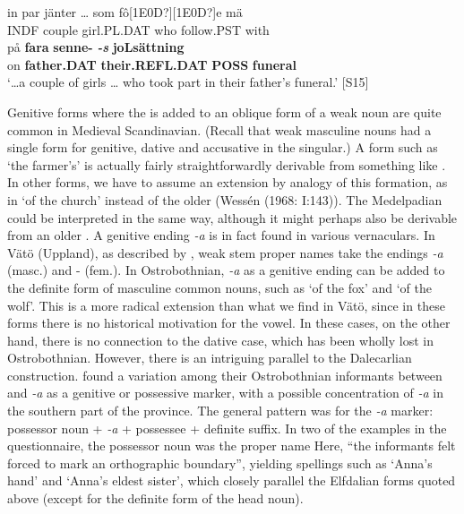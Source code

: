 \ea\label{}
\gll in  par  jänter  …  som  fô[1E0D?][1E0D?]e  mä\\
INDF  couple  girl.PL.DAT    who  follow.PST  with\\
\gll på  \textbf{fara} \textbf{senne-}\textbf{\textit{  }}\textbf{\textit{\nobreakdash-s}} \textbf{joLsättning} \\
on  \textbf{father.DAT} \textbf{their.REFL.DAT} \textbf{POSS} \textbf{funeral} \\
\glt ‘…a couple of girls … who took part in their father’s funeral.’ [S15]
\z

Genitive forms where the is added to an oblique form of a weak noun are quite common in Medieval Scandinavian. (Recall that weak masculine nouns had a single form for genitive, dative and accusative in the singular.) A form such as  ‘the farmer’s’ is actually fairly straightforwardly derivable from something like . In other forms, we have to assume an extension by analogy of this formation, as in  ‘of the church’ instead of the older  (Wessén (1968: I:143)). The Medelpadian  could be interpreted in the same way, although it might perhaps also be derivable from an older . A genitive ending\textit{ {}-a} is in fact found in various vernaculars. In Vätö (Uppland), as described by \citet{Schagerström1882}, weak stem proper names take the endings\textit{ {}-a} (masc.) and \nobreakdash- (fem.). In Ostrobothnian,\textit{ {}-a} as a genitive ending can be added to the definite form of masculine common nouns, such as  ‘of the fox’ and  ‘of the wolf’. This is a more radical extension than what we find in Vätö, since in these forms there is no historical motivation for the  vowel. In these cases, on the other hand, there is no connection to the dative case, which has been wholly lost in Ostrobothnian. However, there is an intriguing parallel to the Dalecarlian construction. \citet[43]{ErikssonEtAl1999} found a variation among their Ostrobothnian informants between and\textit{ {}-a} as a genitive or possessive marker, with a possible concentration of\textit{ {}-a} in the southern part of the province. The general pattern was for the\textit{ {}-a} marker: possessor noun +\textit{ {}-a} + possessee + definite suffix. In two of the examples in the questionnaire, the possessor noun was the proper name Here, “the informants felt forced to mark an orthographic boundary”, yielding spellings such as  ‘Anna’s hand’ and ‘Anna’s eldest sister’, which closely parallel the Elfdalian forms quoted above (except for the definite form of the head noun).

